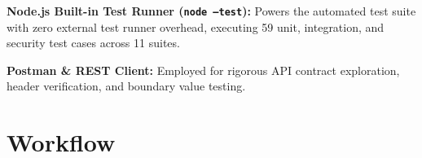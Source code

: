 \documentclass[11pt,a4paper]{article}
\begin{document}
\textbf{Node.js Built-in Test Runner (\texttt{node --test}):} Powers the automated test suite with zero external test runner overhead, executing 59 unit, integration, and security test cases across 11 suites.

\textbf{Postman \& REST Client:} Employed for rigorous API contract exploration, header verification, and boundary value testing.

\newpage
\section*{{\color{TitleBlue}\bfseries
\fontsize{18}{22}\selectfont Workflow}}

\vspace{0.10in}
\end{document}
